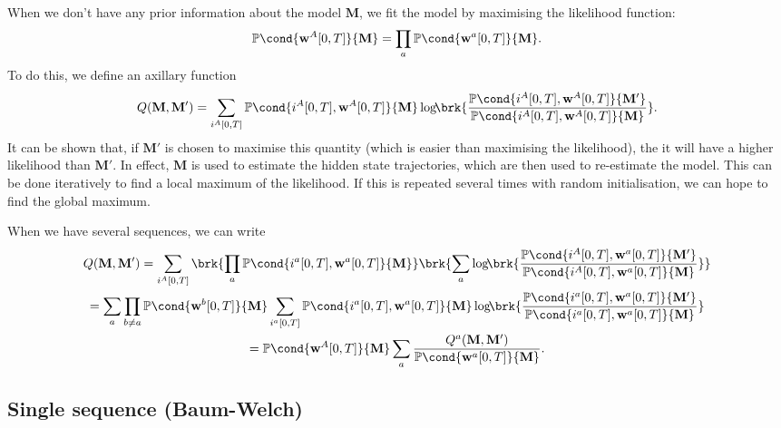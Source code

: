 \documentclass[12pt]{article}
\newcommand{\w}{\mathbf{w}}
\newcommand{\M}{\mathbf{M}}
\newcommand{\pr}{\mathbb{P}}
\begin{document}
When we don't have any prior information about the model $\M$, we fit the model by maximising the likelihood function:
%
\begin{equation}\label{eq:like}
  \pr\cond{\w^A[0,T]}{\M} = \prod_a \pr\cond{\w^a[0,T]}{\M}.
\end{equation}
%
To do this, we define an axillary function
%
\begin{equation}\label{eq:emq}
  Q(\M,\M') = \sum_{i^A[0,T]} \pr\cond{i^A[0,T],\w^A[0,T]}{\M} \log\!\! \brk{
      \frac{ \pr\cond{i^A[0,T],\w^A[0,T]}{\M'} }{ \pr\cond{i^A[0,T],\w^A[0,T]}{\M} } }.
\end{equation}
%
It can be shown that, if $\M'$ is chosen to maximise this quantity (which is easier than maximising the likelihood), the it will have a higher likelihood than $\M'$.
In effect, $\M$ is used to estimate the hidden state trajectories, which are then used to re-estimate the model.
This can be done iteratively to find a local maximum of the likelihood.
If this is repeated several times with random initialisation, we can hope to find the global maximum.

When we have several sequences, we can write
%
\begin{multline}\label{eq:emqseveral}
  Q(\M,\M') = \sum_{i^A[0,T]} \brk{ \prod_a \pr\cond{i^a[0,T],\w^a[0,T]}{\M} } \brk{\sum_a  \log\!\!  \brk{
      \frac{ \pr\cond{i^A[0,T],\w^a[0,T]}{\M'} }{ \pr\cond{i^A[0,T],\w^a[0,T]}{\M} } } }\\
   = \sum_a \prod_{b \neq a} \pr\cond{\w^b[0,T]}{\M} \sum_{i^a[0,T]} \pr\cond{i^a[0,T],\w^a[0,T]}{\M} \log\!\!  \brk{
      \frac{ \pr\cond{i^a[0,T],\w^a[0,T]}{\M'} }{ \pr\cond{i^a[0,T],\w^a[0,T]}{\M} } } \\
   = \pr\cond{\w^A[0,T]}{\M} \sum_a \frac{Q^a(\M,\M')}{\pr\cond{\w^a[0,T]}{\M}}.
\end{multline}
%

\subsection{Single sequence (Baum-Welch) \label{sec:bw}}
\end{document}
